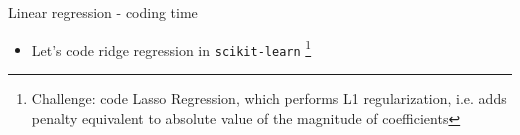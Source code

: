 \documentclass[aspectratio=169]{beamer}
\begin{document}
\begin{frame}{Linear regression - coding time}
    \begin{itemize}
        \item Let's code ridge regression in \texttt{scikit-learn} 
        \footnote{Challenge: code Lasso Regression, which performs L1 regularization, i.e. adds penalty equivalent to absolute value of the magnitude of coefficients}
    \end{itemize}
\end{frame}


\end{document}
